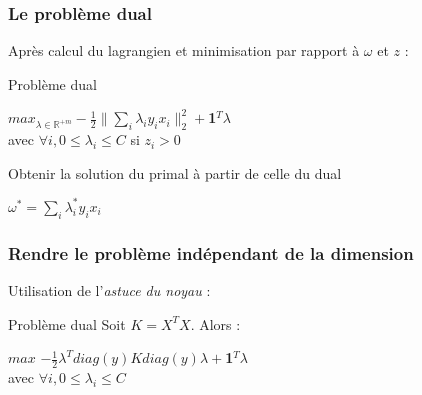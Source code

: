 \documentclass{beamer}
\begin{document}
\begin{frame}
\frametitle{Le problème dual}

Après calcul du lagrangien et minimisation par rapport à $\omega$ et $z$ :

\begin{block}{Problème dual}
             \begin{center}
             $max_{\lambda \in \mathbb{R}^{+m}} -\frac{1}{2}\|\sum_i\lambda_iy_ix_i\|^2_2 + $\textbf{1}$^T\lambda$\\ 
             avec $\forall i, 0 \leq \lambda_i \leq C$ si $z_i > 0$\\
             \end{center}
\end{block}

\begin{block}{Obtenir la solution du primal à partir de celle du dual}
             \begin{center}
               $\omega^{*} = \sum_i \lambda^{*}_i y_i x_i$
             \end{center}
\end{block}

\end{frame}

\begin{frame}
\frametitle{Rendre le problème indépendant de la dimension}

Utilisation de l'\emph{astuce du noyau} :

\begin{block}{Problème dual}
Soit $K = X^TX$. Alors :
                 \begin{center}
                 $max$ $-\frac{1}{2}\lambda^Tdiag(y)Kdiag(y)\lambda+$\textbf{1}$^T\lambda$\\
                 avec $\forall i, 0 \leq \lambda_i \leq C$ 
                 \end{center}
\end{block}

\end{frame}
\end{document}
